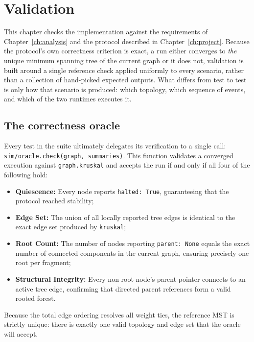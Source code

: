 \chapter{Validation}\label{ch:validation}

This chapter checks the implementation against the requirements of
Chapter~\ref{ch:analysis} and the protocol described in Chapter~\ref{ch:project}. Because
the protocol's own correctness criterion is exact, a run either converges to \emph{the}
unique minimum spanning tree of the current graph or it does not, validation is built
around a single reference check applied uniformly to every scenario, rather than a
collection of hand-picked expected outputs. What differs from test to test is only how
that scenario is produced: which topology, which sequence of events, and which of the two
runtimes executes it.

\section{The correctness oracle}\label{sec:oracle}

Every test in the suite ultimately delegates its verification to a single call:
\texttt{sim/oracle.check(graph, summaries)}. This function validates a converged execution
against \texttt{graph.kruskal} and accepts the run if and only if all four of the
following hold:

\begin{itemize}
  \item \textbf{Quiescence:} Every node reports \texttt{halted: True}, guaranteeing that
  the protocol reached stability;
  \item \textbf{Edge Set:} The union of all locally reported tree edges is identical to
  the exact edge set produced by \texttt{kruskal};
  \item \textbf{Root Count:} The number of nodes reporting \texttt{parent: None} equals
  the exact number of connected components in the current graph, ensuring precisely one
  root per fragment;
  \item \textbf{Structural Integrity:} Every non-root node's parent pointer connects to an
  active tree edge, confirming that directed parent references form a valid rooted forest.
\end{itemize}

Because the total edge ordering resolves all weight ties, the reference MST is strictly
unique: there is exactly one valid topology and edge set that the oracle will accept.

